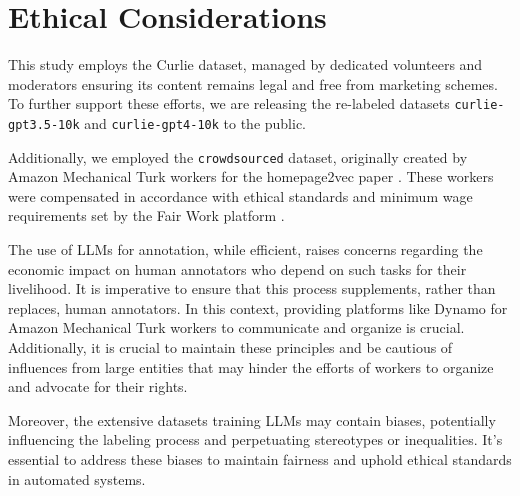 \section{Ethical Considerations}\label{sec:ethical-considerations}
This study employs the Curlie dataset, managed by dedicated volunteers and moderators ensuring its content remains legal and free from marketing schemes. 
To further support these efforts, we are releasing the re-labeled datasets \texttt{curlie-gpt3.5-10k} and \texttt{curlie-gpt4-10k} to the public.

Additionally, we employed the \texttt{crowdsourced} dataset, originally created by Amazon Mechanical Turk workers for the homepage2vec paper \cite{homepage2vec}. 
These workers were compensated in accordance with ethical standards and minimum wage requirements set by the Fair Work platform \cite{ethics2}.


The use of LLMs for annotation, while efficient, raises concerns regarding the economic impact on human annotators who depend on such tasks for their livelihood. 
It is imperative to ensure that this process supplements, rather than replaces, human annotators. In this context, providing platforms like Dynamo \cite{ethics1} for Amazon Mechanical Turk workers to communicate and organize is crucial.
Additionally, it is crucial to maintain these principles and be cautious of influences from large entities that may hinder the efforts of workers to organize and advocate for their rights.

Moreover, the extensive datasets training LLMs may contain biases, potentially influencing the labeling process and perpetuating stereotypes or inequalities. 
It's essential to address these biases to maintain fairness and uphold ethical standards in automated systems.